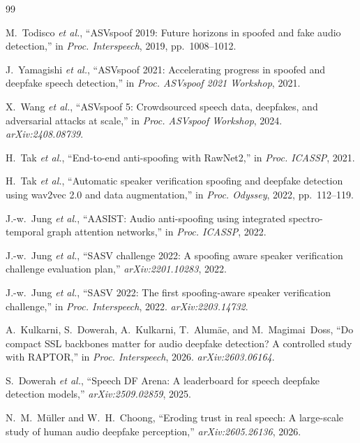 \documentclass[11pt]{article}
\begin{document}
\begin{thebibliography}{99}

M.~Todisco \emph{et al.},
``ASVspoof 2019: Future horizons in spoofed and fake audio detection,''
in \emph{Proc. Interspeech}, 2019, pp.~1008--1012.

J.~Yamagishi \emph{et al.},
``ASVspoof 2021: Accelerating progress in spoofed and deepfake speech
detection,'' in \emph{Proc. ASVspoof 2021 Workshop}, 2021.

X.~Wang \emph{et al.},
``ASVspoof 5: Crowdsourced speech data, deepfakes, and adversarial
attacks at scale,'' in \emph{Proc. ASVspoof Workshop}, 2024.
\emph{arXiv:2408.08739}.

H.~Tak \emph{et al.},
``End-to-end anti-spoofing with RawNet2,''
in \emph{Proc. ICASSP}, 2021.

H.~Tak \emph{et al.},
``Automatic speaker verification spoofing and deepfake detection using
wav2vec 2.0 and data augmentation,''
in \emph{Proc. Odyssey}, 2022, pp.~112--119.

J.-w.~Jung \emph{et al.},
``AASIST: Audio anti-spoofing using integrated spectro-temporal graph
attention networks,'' in \emph{Proc. ICASSP}, 2022.

J.-w.~Jung \emph{et al.},
``SASV challenge 2022: A spoofing aware speaker verification challenge
evaluation plan,'' \emph{arXiv:2201.10283}, 2022.

J.-w.~Jung \emph{et al.},
``SASV 2022: The first spoofing-aware speaker verification challenge,''
in \emph{Proc. Interspeech}, 2022. \emph{arXiv:2203.14732}.

A.~Kulkarni, S.~Dowerah, A.~Kulkarni, T.~Alum\"{a}e, and M.~Magimai~Doss,
``Do compact SSL backbones matter for audio deepfake detection? A
controlled study with RAPTOR,'' in \emph{Proc. Interspeech}, 2026.
\emph{arXiv:2603.06164}.

S.~Dowerah \emph{et al.},
``Speech DF Arena: A leaderboard for speech deepfake detection models,''
\emph{arXiv:2509.02859}, 2025.

N.~M.~M\"uller and W.~H.~Choong,
``Eroding trust in real speech: A large-scale study of human audio
deepfake perception,'' \emph{arXiv:2605.26136}, 2026.


\end{thebibliography}
\end{document}
